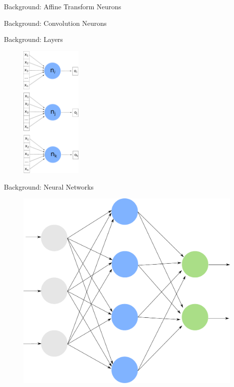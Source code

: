 \documentclass{beamer}
\begin{document}
\begin{frame}{Background: Affine Transform Neurons}



\end{frame}

\begin{frame}{Background: Convolution Neurons}
\centering
{}
\end{frame}

\begin{frame}{Background: Layers}

\begin{figure}
    \includegraphics[width=3cm]{images/layer.pdf}
\end{figure}

\end{frame}


\begin{frame}{Background: Neural Networks}

\begin{figure}
    \centering
    \includegraphics[width=0.6\linewidth]{images/neural_network.pdf}
\end{figure}
\end{frame}
\end{document}
